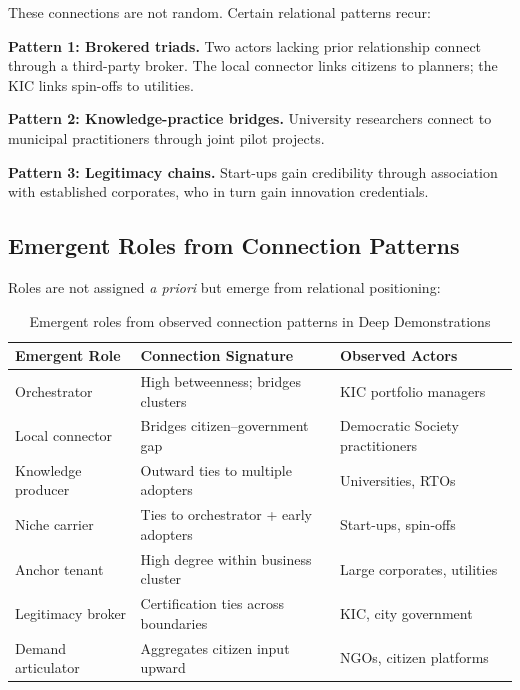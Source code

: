 \documentclass[11pt,a4paper]{article}
\begin{document}
These connections are not random. Certain relational patterns recur:

\textbf{Pattern 1: Brokered triads.} Two actors lacking prior relationship connect through a third-party broker. The local connector links citizens to planners; the KIC links spin-offs to utilities.

\textbf{Pattern 2: Knowledge-practice bridges.} University researchers connect to municipal practitioners through joint pilot projects.

\textbf{Pattern 3: Legitimacy chains.} Start-ups gain credibility through association with established corporates, who in turn gain innovation credentials.

\subsection{Emergent Roles from Connection Patterns}

Roles are not assigned \textit{a priori} but emerge from relational positioning:

\begin{table}[htbp]
\centering
\small
\caption{Emergent roles from observed connection patterns in Deep Demonstrations}
\label{tab:emergent-roles}
\begin{tabular}{@{}p{2.5cm}p{4.2cm}p{5cm}@{}}
\toprule
\textbf{Emergent Role} & \textbf{Connection Signature} & \textbf{Observed Actors} \\
\midrule
Orchestrator & High betweenness; bridges clusters & KIC portfolio managers \\
Local connector & Bridges citizen--government gap & Democratic Society practitioners \\
Knowledge producer & Outward ties to multiple adopters & Universities, RTOs \\
Niche carrier & Ties to orchestrator + early adopters & Start-ups, spin-offs \\
Anchor tenant & High degree within business cluster & Large corporates, utilities \\
Legitimacy broker & Certification ties across boundaries & KIC, city government \\
Demand articulator & Aggregates citizen input upward & NGOs, citizen platforms \\
\bottomrule
\end{tabular}
\end{table}
\end{document}
